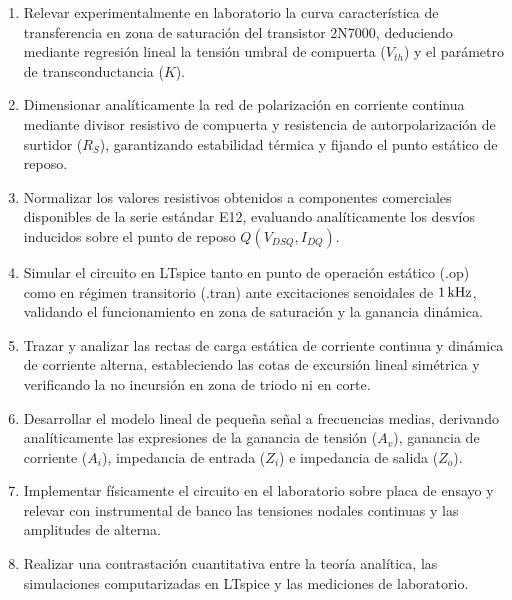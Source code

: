 \begin{enumerate}
  \item Relevar experimentalmente en laboratorio la curva característica de transferencia en zona de saturación del
    transistor 2N7000, deduciendo mediante regresión lineal la tensión umbral de compuerta ($V_{th}$) y el parámetro de
    transconductancia ($K$).
  \item Dimensionar analíticamente la red de polarización en corriente continua mediante divisor resistivo de compuerta
    y resistencia de autorpolarización de surtidor ($R_S$), garantizando estabilidad térmica y fijando el punto estático
    de reposo.
  \item Normalizar los valores resistivos obtenidos a componentes comerciales disponibles de la serie estándar E12,
    evaluando analíticamente los desvíos inducidos sobre el punto de reposo $Q(V_{DSQ}, I_{DQ})$.
  \item Simular el circuito en LTspice tanto en punto de operación estático (.op) como en régimen transitorio (.tran) ante
    excitaciones senoidales de $1\,\mathrm{kHz}$, validando el funcionamiento en zona de saturación y la ganancia dinámica.
  \item Trazar y analizar las rectas de carga estática de corriente continua y dinámica de corriente alterna,
    estableciendo las cotas de excursión lineal simétrica y verificando la no incursión en zona de triodo ni en corte.
  \item Desarrollar el modelo lineal de pequeña señal a frecuencias medias, derivando analíticamente las expresiones de
    la ganancia de tensión ($A_v$), ganancia de corriente ($A_i$), impedancia de entrada ($Z_i$) e impedancia de salida
    ($Z_o$).
  \item Implementar físicamente el circuito en el laboratorio sobre placa de ensayo y relevar con instrumental de banco
    las tensiones nodales continuas y las amplitudes de alterna.
  \item Realizar una contrastación cuantitativa entre la teoría analítica, las simulaciones computarizadas en
    LTspice y las mediciones de laboratorio.
\end{enumerate}
